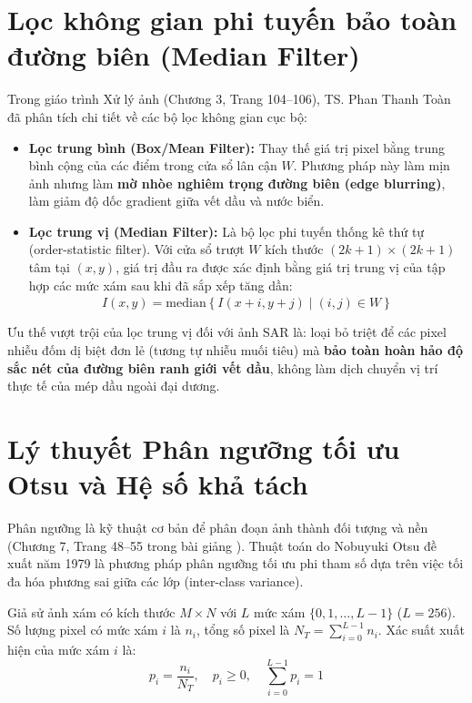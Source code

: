 \section{Lọc không gian phi tuyến bảo toàn đường biên (Median Filter)}
\label{sec:median_filter}
Trong giáo trình Xử lý ảnh \cite{toan2024xla} (Chương 3, Trang 104--106), TS. Phan Thanh Toàn đã phân tích chi tiết về các bộ lọc không gian cục bộ:
\begin{itemize}
    \item \textbf{Lọc trung bình (Box/Mean Filter):} Thay thế giá trị pixel bằng trung bình cộng của các điểm trong cửa sổ lân cận $W$. Phương pháp này làm mịn ảnh nhưng làm \textbf{mờ nhòe nghiêm trọng đường biên (edge blurring)}, làm giảm độ dốc gradient giữa vết dầu và nước biển.
    \item \textbf{Lọc trung vị (Median Filter):} Là bộ lọc phi tuyến thống kê thứ tự (order-statistic filter). Với cửa sổ trượt $W$ kích thước $(2k+1) \times (2k+1)$ tâm tại $(x, y)$, giá trị đầu ra được xác định bằng giá trị trung vị của tập hợp các mức xám sau khi đã sắp xếp tăng dần:
    \begin{equation}
        \hat{I}(x, y) = \text{median}\left\{ I(x + i, y + j) \mid (i, j) \in W \right\}
        \label{eq:median_filter}
    \end{equation}
\end{itemize}

Ưu thế vượt trội của lọc trung vị đối với ảnh SAR là: loại bỏ triệt để các pixel nhiễu đốm dị biệt đơn lẻ (tương tự nhiễu muối tiêu) mà \textbf{bảo toàn hoàn hảo độ sắc nét của đường biên ranh giới vết dầu}, không làm dịch chuyển vị trí thực tế của mép dầu ngoài đại dương.

\section{Lý thuyết Phân ngưỡng tối ưu Otsu và Hệ số khả tách}
\label{sec:otsu_theory}
Phân ngưỡng là kỹ thuật cơ bản để phân đoạn ảnh thành đối tượng và nền (Chương 7, Trang 48--55 trong bài giảng \cite{toan2024xla}). Thuật toán do Nobuyuki Otsu đề xuất năm 1979 \cite{otsu1979threshold} là phương pháp phân ngưỡng tối ưu phi tham số dựa trên việc tối đa hóa phương sai giữa các lớp (inter-class variance).

Giả sử ảnh xám có kích thước $M \times N$ với $L$ mức xám $\{0, 1, \dots, L-1\}$ ($L = 256$). Số lượng pixel có mức xám $i$ là $n_i$, tổng số pixel là $N_T = \sum_{i=0}^{L-1} n_i$. Xác suất xuất hiện của mức xám $i$ là:
\begin{equation}
    p_i = \frac{n_i}{N_T}, \quad p_i \ge 0, \quad \sum_{i=0}^{L-1} p_i = 1
\end{equation}

